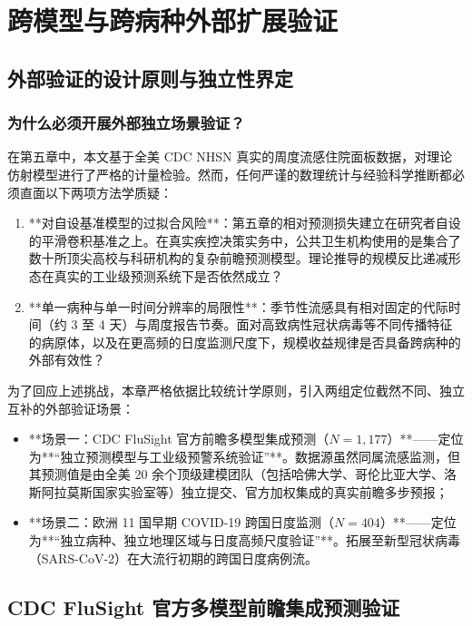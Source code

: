 \chapter{跨模型与跨病种外部扩展验证}\label{ch:external}

\section{外部验证的设计原则与独立性界定}\label{sec:ext_design}

\subsection{为什么必须开展外部独立场景验证？}
在第五章中，本文基于全美 CDC NHSN 真实的周度流感住院面板数据，对理论仿射模型进行了严格的计量检验。然而，任何严谨的数理统计与经验科学推断都必须直面以下两项方法学质疑：
\begin{enumerate}[label=(\arabic*)]
    \item **对自设基准模型的过拟合风险**：第五章的相对预测损失建立在研究者自设的平滑卷积基准之上。在真实疾控决策实务中，公共卫生机构使用的是集合了数十所顶尖高校与科研机构的复杂前瞻预测模型。理论推导的规模反比递减形态在真实的工业级预测系统下是否依然成立？
    \item **单一病种与单一时间分辨率的局限性**：季节性流感具有相对固定的代际时间（约 3 至 4 天）与周度报告节奏。面对高致病性冠状病毒等不同传播特征的病原体，以及在更高频的日度监测尺度下，规模收益规律是否具备跨病种的外部有效性？
\end{enumerate}

为了回应上述挑战，本章严格依据比较统计学原则，引入两组定位截然不同、独立互补的外部验证场景：
\begin{itemize}
    \item **场景一：CDC FluSight 官方前瞻多模型集成预测（$N = 1{,}177$）**——定位为**“独立预测模型与工业级预警系统验证”**。数据源虽然同属流感监测，但其预测值是由全美 20 余个顶级建模团队（包括哈佛大学、哥伦比亚大学、洛斯阿拉莫斯国家实验室等）独立提交、官方加权集成的真实前瞻多步预报；
    \item **场景二：欧洲 11 国早期 COVID-19 跨国日度监测（$N = 404$）**——定位为**“独立病种、独立地理区域与日度高频尺度验证”**。拓展至新型冠状病毒（SARS-CoV-2）在大流行初期的跨国日度病例流。
\end{itemize}

\section{CDC FluSight 官方多模型前瞻集成预测验证}\label{sec:flusight}

